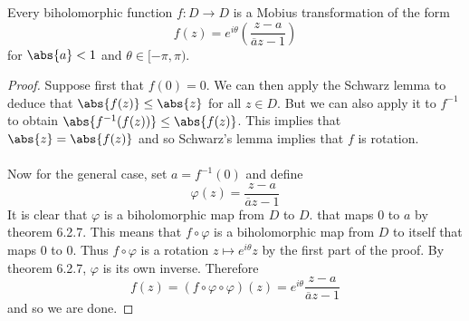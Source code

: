 \documentclass[a4paper]{article}
\begin{document}
\begin{thm}{}{} Every biholomorphic function $f:D\to D$ is a Mobius transformation of the form $$f(z)=e^{i\theta}\left(\frac{z-a}{\overline{a}z-1}\right)$$ for $\abs{a}<1$ and $\theta\in[-\pi,\pi)$. \tcbline
\begin{proof}
Suppose first that $f(0)=0$. We can then apply the Schwarz lemma to deduce that $\abs{f(z)}\leq\abs{z}$ for all $z\in D$. But we can also apply it to $f^{-1}$ to obtain $\abs{f^{-1}(f(z))}\leq\abs{f(z)}$. This implies that $\abs{z}=\abs{f(z)}$ and so Schwarz's lemma implies that $f$ is rotation. \\~\\

Now for the general case, set $a=f^{-1}(0)$ and define $$\varphi(z)=\frac{z-a}{\overline{a}z-1}$$ It is clear that $\varphi$ is a biholomorphic map from $D$ to $D$. that maps $0$ to $a$ by theorem 6.2.7. This means that $f\circ\varphi$ is a biholomorphic map from $D$ to itself that maps $0$ to $0$. Thus $f\circ\varphi$ is a rotation $z\mapsto e^{i\theta}z$ by the first part of the proof. By theorem 6.2.7, $\varphi$ is its own inverse. Therefore $$f(z)=(f\circ\varphi\circ\varphi)(z)=e^{i\theta}\frac{z-a}{\overline{a}z-1}$$ and so we are done. 
\end{proof}
\end{thm}
\end{document}
